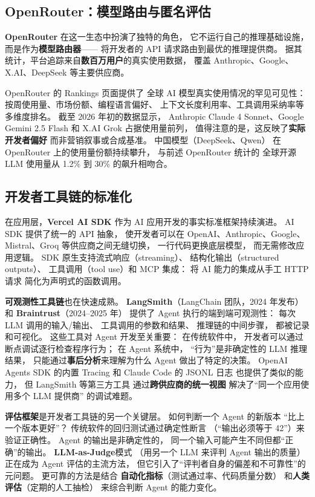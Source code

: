\subsection{OpenRouter：模型路由与匿名评估}

\textbf{OpenRouter} 在这一生态中扮演了独特的角色，
它不运行自己的推理基础设施，
而是作为\textbf{模型路由器}——
将开发者的 API 请求路由到最优的推理提供商。
据其统计，平台追踪来自\textbf{数百万用户}的真实使用数据，
覆盖 Anthropic、Google、X.AI、DeepSeek 等主要供应商。

OpenRouter 的 Rankings 页面提供了
全球 AI 模型真实使用情况的罕见可见性：
按周使用量、市场份额、编程语言偏好、
上下文长度利用率、工具调用采纳率等多维度排名。
截至 2026 年初的数据显示，
Anthropic Claude 4 Sonnet、Google Gemini 2.5 Flash
和 X.AI Grok 占据使用量前列，
值得注意的是，这反映了\textbf{实际开发者偏好}
而非营销叙事或合成基准。
中国模型（DeepSeek、Qwen）
在 OpenRouter 上的使用量份额持续攀升，
与前述 OpenRouter 统计的
全球开源 LLM 使用量从 1.2\% 到 30\% 的飙升相吻合。

\subsection{开发者工具链的标准化}

在应用层，\textbf{Vercel AI SDK}
作为 AI 应用开发的事实标准框架持续演进。
AI SDK 提供了统一的 API 抽象，
使开发者可以在 OpenAI、Anthropic、Google、
Mistral、Groq 等供应商之间无缝切换，
一行代码更换底层模型，
而无需修改应用逻辑。
SDK 原生支持流式响应（streaming）、
结构化输出（structured outputs）、
工具调用（tool use）和 MCP 集成：
将 AI 能力的集成从手工 HTTP 请求
简化为声明式的函数调用。

\textbf{可观测性工具链}也在快速成熟。
\textbf{LangSmith}（LangChain 团队，2024 年发布）
和 \textbf{Braintrust}（2024--2025 年）
提供了 Agent 执行的端到端可观测性：
每次 LLM 调用的输入/输出、
工具调用的参数和结果、
推理链的中间步骤，
都被记录和可视化。
这些工具对 Agent 开发至关重要：
在传统软件中，
开发者可以通过断点调试逐行检查程序行为；
在 Agent 系统中，
“行为”是非确定性的 LLM 推理结果，
只能通过\textbf{事后分析}来理解为什么
Agent 做出了特定的决策。
OpenAI Agents SDK 的内置 Tracing
和 Claude Code 的 JSONL 日志
也提供了类似的能力，
但 LangSmith 等第三方工具
通过\textbf{跨供应商的统一视图}
解决了“同一个应用使用多个 LLM 提供商”
的调试难题。

\textbf{评估框架}是开发者工具链的另一个关键层。
如何判断一个 Agent 的新版本
“比上一个版本更好”？
传统软件的回归测试通过确定性断言
（“输出必须等于 42”）来验证正确性。
Agent 的输出是非确定性的，
同一个输入可能产生不同但都“正确”的输出。
\textbf{LLM-as-Judge}模式
（用另一个 LLM 来评判 Agent 输出的质量）
正在成为 Agent 评估的主流方法，
但它引入了“评判者自身的偏差和不可靠性”的元问题。
更可靠的方法是结合
\textbf{自动化指标}（测试通过率、代码质量分数）
和\textbf{人类评估}（定期的人工抽检）
来综合判断 Agent 的能力变化。

